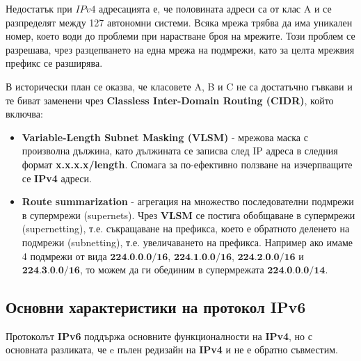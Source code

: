 \documentclass[fleqn,12pt]{article}
\begin{document}
Недостатък при $IPv4$ адресацията е, че половината адреси са от клас A и се разпределят между 127 автономни системи.
Всяка мрежа трябва да има уникален номер, което води до проблеми при нарастване броя на мрежите.
Този проблем се разрешава, чрез разцепването на една мрежа на подмрежи, като за целта мрежвия префикс се разширява.

В исторически план се оказва, че класовете A, B и C не са достатъчно гъвкави и те биват заменени чрез \textbf{Classless Inter-Domain Routing (CIDR)}, който включва:
\begin{itemize}
    \item \textbf{Variable-Length Subnet Masking (VLSM)} - мрежова маска с произволна дължина, като дължината се записва след IP адреса в следния формат \textbf{x.x.x.x/length}.
    Спомага за по-ефективно ползване на изчерпващите се \textbf{IPv4} адреси.
    \item \textbf{Route summarization} - агрегация на множество последователни подмрежи в супермрежи (supernets).
    Чрез \textbf{VLSM} се постига обобщаване в супермрежи (supernetting), т.е. съкращаване на префикса, което е обратното деленето на подмрежи (subnetting), т.е. увеличаването на префикса.
    Например ако имаме 4 подмрежи от вида $\textbf{224.0.0.0/16}$, $\textbf{224.1.0.0/16}$, $\textbf{224.2.0.0/16}$ и $\textbf{224.3.0.0/16}$, то можем да ги обединим в супермрежата $\textbf{224.0.0.0/14}$.
\end{itemize}

\subsection{Основни характеристики на протокол IPv6}

Протоколът \textbf{IPv6} поддържа основните функционалности на \textbf{IPv4}, но с основната разликата, че e пълен редизайн на \textbf{IPv4} и не е обратно съвместим.
\end{document}

